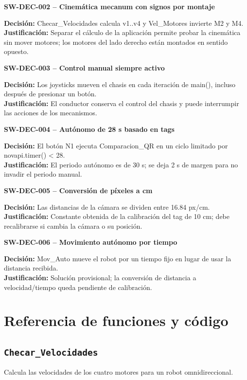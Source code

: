\medskip\noindent\textbf{SW-DEC-002 -- Cinemática mecanum con signos por montaje}\par
\textbf{Decisi\'on:} Checar\_Velocidades calcula v1..v4 y Vel\_Motores invierte M2 y M4.\\
\textbf{Justificaci\'on:} Separar el cálculo de la aplicación permite probar la cinemática sin mover motores; los motores del lado derecho están montados en sentido opuesto.

\medskip\noindent\textbf{SW-DEC-003 -- Control manual siempre activo}\par
\textbf{Decisi\'on:} Los joysticks mueven el chasis en cada iteración de main(), incluso después de presionar un botón.\\
\textbf{Justificaci\'on:} El conductor conserva el control del chasis y puede interrumpir las acciones de los mecanismos.

\medskip\noindent\textbf{SW-DEC-004 -- Autónomo de 28 s basado en tags}\par
\textbf{Decisi\'on:} El botón N1 ejecuta Comparacion\_QR en un ciclo limitado por novapi.timer() < 28.\\
\textbf{Justificaci\'on:} El periodo autónomo es de 30 s; se deja 2 s de margen para no invadir el periodo manual.

\medskip\noindent\textbf{SW-DEC-005 -- Conversión de píxeles a cm}\par
\textbf{Decisi\'on:} Las distancias de la cámara se dividen entre 16.84 px/cm.\\
\textbf{Justificaci\'on:} Constante obtenida de la calibración del tag de 10 cm; debe recalibrarse si cambia la cámara o su posición.

\medskip\noindent\textbf{SW-DEC-006 -- Movimiento autónomo por tiempo}\par
\textbf{Decisi\'on:} Mov\_Auto mueve el robot por un tiempo fijo en lugar de usar la distancia recibida.\\
\textbf{Justificaci\'on:} Solución provisional; la conversión de distancia a velocidad/tiempo queda pendiente de calibración.

\section{Referencia de funciones y c\'odigo}
\subsection{\texttt{Checar\_Velocidades}}
\label{fn:ChecarVelocidades}
Calcula las velocidades de los cuatro motores para un robot omnidireccional.

